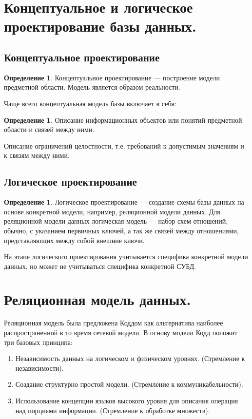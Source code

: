 \documentclass[12pt]{report}
\theoremstyle{definition}
\newtheorem{definition}[theorem]{Определение}
\begin{document}
\section{Концептуальное и логическое проектирование базы данных.}

\subsection{Концептуальное проектирование}

\begin{definition}
Концептуальное проектирование --- построение модели предметной
области. Модель является образом реальности.
\end{definition}

Чаще всего концептуальная модель базы включает в себя:
\begin{definition}
\item Описание информационных объектов или понятий
  предметной области и связей между ними.
\item Описание ограничений целостности, т.е. требований к
  допустимым значениям и к связям между ними.
\end{definition}

\subsection{Логическое проектирование}

\begin{definition}
Логическое проектирование --- создание схемы базы данных на основе конкретной модели,
  например, реляционной модели данных. Для реляционной модели данных логическая модель ---
  набор схем отношений, обычно, с указанием первичных ключей, а так же связей между
  отношениями, представляющих между собой внешние ключи.

На этапе логического проектирования учитывается специфика конкретной модели данных,
но может не учитываться специфика конкретной СУБД.
\end{definition}


\section{Реляционная модель данных.}

Реляционная модель была предложена Коддом как альтернатива наиболее
распространенной в то время сетевой модели. В основу модели Кодд
положит три базовых принципа:
\begin{enumerate}
\item Независимость данных на логическом и физическом уровнях.
  (Стремление к независимости).
\item Создание структурно простой модели.
  (Стремление к коммуникабельности).
\item Использование концепции языков высокого уровня для описания
  операция над порциями информации.
  (Стремление к обработке множеств).
\end{enumerate}
\end{document}
